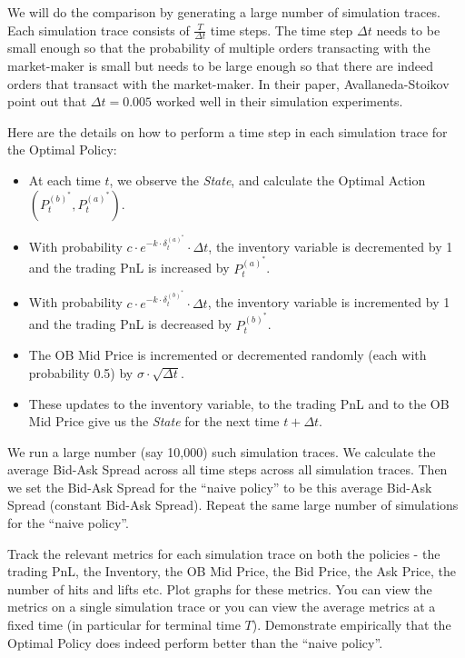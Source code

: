 \documentclass[12pt]{exam}
\begin{document}
\begin{questions}
We will do the comparison by generating a large number of simulation traces. Each simulation trace consists of $\frac T {\Delta t}$ time steps. The time step $\Delta t$ needs to be small enough so that the probability of multiple orders transacting with the market-maker is small but needs to be large enough so that there are indeed orders that transact with the market-maker. In their paper, Avallaneda-Stoikov point out that $\Delta t = 0.005$ worked well in their simulation experiments.

Here are the details on how to perform a time step in each simulation trace for the Optimal Policy:

\begin{itemize}
\item At each time $t$, we observe the {\em State}, and calculate the Optimal Action $(P_t^{(b)^*}, P_t^{(a)^*})$.
\item With probability $c \cdot e^{-k \cdot \delta_t^{(a)^*}} \cdot \Delta t$, the inventory variable is decremented by 1 and the trading PnL is increased by $P_t^{(a)^*}$.
\item With probability $c \cdot e^{-k \cdot \delta_t^{(b)^*}} \cdot \Delta t$, the inventory variable is incremented by 1 and the trading PnL is decreased by $P_t^{(b)^*}$.
\item The OB Mid Price is incremented or decremented randomly (each with probability 0.5) by $\sigma \cdot \sqrt{\Delta t}$.
\item These updates to the inventory variable, to the trading PnL and to the OB Mid Price give us the {\em State} for the next time $t + \Delta t$.
\end{itemize}

We run a large number (say 10,000) such simulation traces. We calculate the average Bid-Ask Spread across all time steps across all simulation traces. Then we set the Bid-Ask Spread for the ``naive policy'' to be this average Bid-Ask Spread (constant Bid-Ask Spread). Repeat the same large number of simulations for the ``naive policy''.

Track the relevant metrics for each simulation trace on both the policies - the trading PnL, the Inventory, the OB Mid Price, the Bid Price, the Ask Price, the number of hits and lifts etc. Plot graphs for these metrics. You can view the metrics on a single simulation trace or you can view the average metrics at a fixed time (in particular for terminal time $T$). Demonstrate empirically that the Optimal Policy does indeed perform better than the ``naive policy''. 


\end{questions}
\end{document}

